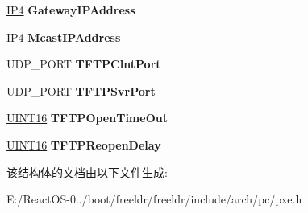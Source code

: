 \begin{DoxyCompactItemize}
\hyperlink{union_i_p4}{I\+P4} {\bfseries Gateway\+I\+P\+Address}
\item 
\mbox{\label{structs___p_x_e_n_v___t_f_t_p___r_e_a_d___f_i_l_e_ad37d5ac642a865b91bcf0ee0b9197c98}} 
\hyperlink{union_i_p4}{I\+P4} {\bfseries Mcast\+I\+P\+Address}
\item 
\mbox{\label{structs___p_x_e_n_v___t_f_t_p___r_e_a_d___f_i_l_e_a40f6931df21f57aca2fb30ddac84b943}} 
U\+D\+P\+\_\+\+P\+O\+RT {\bfseries T\+F\+T\+P\+Clnt\+Port}
\item 
\mbox{\label{structs___p_x_e_n_v___t_f_t_p___r_e_a_d___f_i_l_e_a1f927a98108a6c6afb7330ee876a9154}} 
U\+D\+P\+\_\+\+P\+O\+RT {\bfseries T\+F\+T\+P\+Svr\+Port}
\item 
\mbox{\label{structs___p_x_e_n_v___t_f_t_p___r_e_a_d___f_i_l_e_a358c75e6cf92bf5da0d85efd49e1c265}} 
\hyperlink{_processor_bind_8h_a09f1a1fb2293e33483cc8d44aefb1eb1}{U\+I\+N\+T16} {\bfseries T\+F\+T\+P\+Open\+Time\+Out}
\item 
\mbox{\label{structs___p_x_e_n_v___t_f_t_p___r_e_a_d___f_i_l_e_a315ef3d9b8810324e1b98de58659f5a4}} 
\hyperlink{_processor_bind_8h_a09f1a1fb2293e33483cc8d44aefb1eb1}{U\+I\+N\+T16} {\bfseries T\+F\+T\+P\+Reopen\+Delay}
\end{DoxyCompactItemize}


该结构体的文档由以下文件生成\+:\begin{DoxyCompactItemize}
\item 
E\+:/\+React\+O\+S-\/0../boot/freeldr/freeldr/include/arch/pc/pxe.\+h\end{DoxyCompactItemize}
